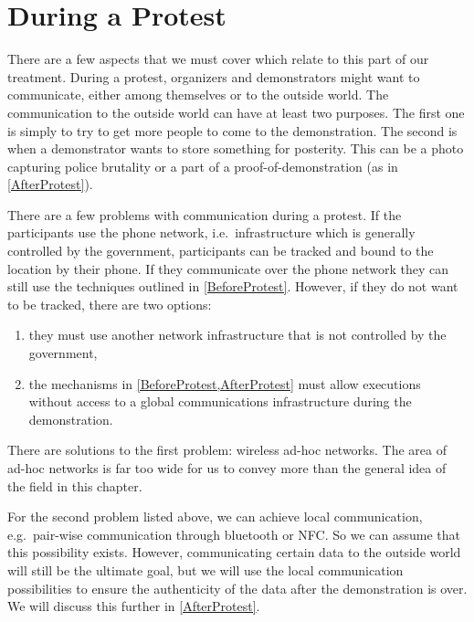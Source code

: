 \section{During a Protest}
\label{DuringProtest}

There are a few aspects that we must cover which relate to this part of our 
treatment.
During a protest, organizers and demonstrators might want to communicate, 
either among themselves or to the outside world.
The communication to the outside world can have at least two purposes.
The first one is simply to try to get more people to come to the demonstration.
The second is when a demonstrator wants to store something for posterity.
This can be a photo capturing police brutality or a part of 
a proof-of-demonstration (as in \cref{AfterProtest}).

There are a few problems with communication during a protest.
If the participants use the phone network, i.e.\ infrastructure which is 
generally controlled by the government, participants can be tracked and bound 
to the location by their phone.
If they communicate over the phone network they can still use the techniques 
outlined in \cref{BeforeProtest}.
However, if they do not want to be tracked, there are two options:
\begin{enumerate}
  \item they must use another network infrastructure that is not controlled by 
    the government,
  \item the mechanisms in \cref{BeforeProtest,AfterProtest} must allow 
    executions without access to a global communications infrastructure during 
    the demonstration.
\end{enumerate}

There are solutions to the first problem: wireless ad-hoc networks.
The area of ad-hoc networks is far too wide for us to convey more than the 
general idea of the field in this chapter.


For the second problem listed above, we can achieve local communication, e.g.\ 
pair-wise communication through bluetooth or \ac{NFC}.
So we can assume that this possibility exists.
However, communicating certain data to the outside world will still be the 
ultimate goal, but we will use the local communication possibilities to ensure 
the authenticity of the data after the demonstration is over.
We will discuss this further in \cref{AfterProtest}.

